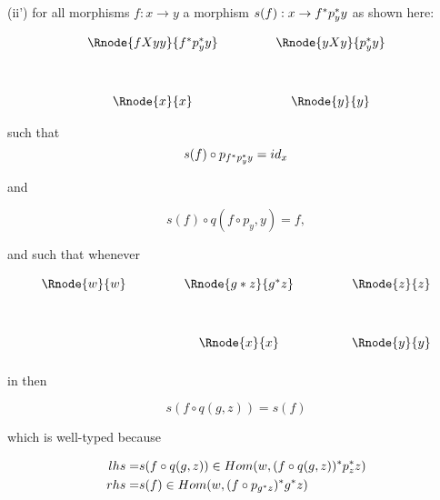 \documentclass[10pt,a4paper]{scrartcl}
\begin{document}
\noindent (ii') for all morphisms $f: x \rightarrow y$ a morphism $s(f) : x \rightarrow f ^* p_y ^* y$ as shown here:

\begin{center}
\begin{displaymath}
\begin{array}{cp{.9cm}c}
\Rnode{fXyy}{f\sub p_y \sub y} & & \Rnode{yXy}{p_y \sub y}\\ [1.2cm]
\Rnode{x}{x}         & & \Rnode{y}{y}
\end{array}
\end{displaymath}
\end{center}

such that 
\begin{equation}
s(f) \circ p_{f^* p_y ^* y}=id_x
\end{equation}

and

\begin{equation}
s(f) \circ q( f \circ p_y     ,y)=f, 
\end{equation}	

and such that whenever

\begin{center}
\begin{displaymath}
\begin{array}{c p{.9cm} c p{.9cm} c}
\Rnode{w}{w}&& \Rnode{g*z}{g \sub z} && \Rnode{z}{z} \\ [1.2cm]
            && \Rnode{x}{x}  && \Rnode{y}{y} \\ [0.2cm]
\end{array}
\end{displaymath}
\end{center}

in  then

\begin{equation}
s(f \circ q(g,z))=s(f)
\end{equation}

which is well-typed because


\begin{align*}
      lhs = &s(f \circ q(g,z)) \in Hom(w,(f \circ q(g,z) ) ^* p_z ^* z ) \\
      rhs = &s(f) \in Hom(w,(f \circ   p_{g ^* z} ) ^*  g ^* z  )\\
\end{align*}
\end{document}
